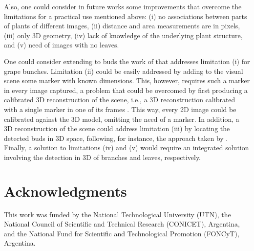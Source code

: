 \documentclass[a4paper,authoryear,review]{elsarticle}
\begin{document}
Also, one could consider in future works some improvements that overcome the limitations for a practical use mentioned above: (i) no associations between parts of plants of different images, (ii) distance and area measurements are in pixels, (iii) only 3D geometry, (iv) lack of knowledge of the underlying plant structure, and (v) need of images with no leaves.

One could consider extending to buds the work of \cite{santos2020grape} that addresses limitation (i) for grape bunches. 
%
Limitation (ii) could be easily addressed by adding to the visual scene some marker with known dimensions. This, however, requires such a marker in every image captured, a problem that could be overcomed by first producing a calibrated 3D reconstruction of the scene, i.e., a 3D reconstruction calibrated with a single marker in one of its frames \cite{hartley2003multiple, moons20093d}. This way, every 2D image could be calibrated against the 3D model, omitting the need of a marker. 
%
In addition, a 3D reconstruction of the scene could address limitation (iii) by locating the detected buds in 3D space, following, for instance, the approach taken by \cite{diaz2018grapevine}.
%
Finally, a solution to limitations (iv) and (v) would require an integrated solution involving the detection in 3D of branches and leaves, respectively. 


\section*{Acknowledgments}

This work was funded by the National Technological University (UTN), the National Council of Scientific and Technical Research (CONICET), Argentina, and the National Fund for Scientific and Technological Promotion (FONCyT), Argentina.


\end{document}
